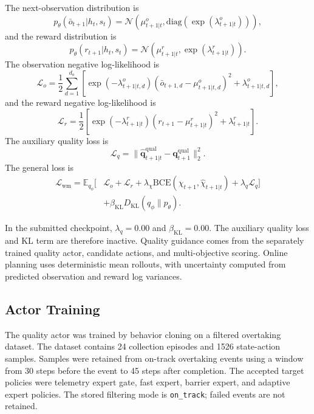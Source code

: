 \documentclass[journal]{IEEEtran}
\begin{document}
The next-observation distribution is
\begin{equation}
p_\theta(\bar{o}_{t+1}|h_t,s_t)
=
\mathcal{N}
(
\mu_{t+1|t}^{o},
\mathrm{diag}(\exp(\lambda_{t+1|t}^{o}))
),
\end{equation}
and the reward distribution is
\begin{equation}
p_\theta(r_{t+1}|h_t,s_t)
=
\mathcal{N}
(
\mu_{t+1|t}^{r},
\exp(\lambda_{t+1|t}^{r})
).
\end{equation}
The observation negative log-likelihood is
\begin{equation}
\mathcal{L}_{o}
=
\frac{1}{2}
\sum_{d=1}^{d_o}
[
\exp(-\lambda_{t+1|t,d}^{o})
(\bar{o}_{t+1,d}-\mu_{t+1|t,d}^{o})^2
+
\lambda_{t+1|t,d}^{o}
],
\end{equation}
and the reward negative log-likelihood is
\begin{equation}
\mathcal{L}_{r}
=
\frac{1}{2}
[
\exp(-\lambda_{t+1|t}^{r})
(r_{t+1}-\mu_{t+1|t}^{r})^2
+
\lambda_{t+1|t}^{r}
].
\end{equation}
The auxiliary quality loss is
\begin{equation}
\mathcal{L}_q
=
\|
\hat{\mathbf q}_{t+1|t}^{\mathrm{qual}}
-
\mathbf q_{t+1}^{\mathrm{qual}}
\|_2^2.
\end{equation}
The general loss is
\begin{equation}
\begin{aligned}
\mathcal{L}_{\mathrm{wm}}
=
\mathbb{E}_{q_\phi}
[
&
\mathcal{L}_o
+
\mathcal{L}_r
+
\lambda_\chi
\mathrm{BCE}
(
\chi_{t+1},
\hat{\chi}_{t+1|t}
)
+
\lambda_q\mathcal{L}_q
]
\\
&
+
\beta_{\mathrm{KL}}
D_{\mathrm{KL}}(q_\phi\|p_\theta).
\end{aligned}
\end{equation}

In the submitted checkpoint, $\lambda_q=0.00$ and
$\beta_{\mathrm{KL}}=0.00$. The auxiliary quality loss and KL term are
therefore inactive. Quality guidance comes from the separately trained
quality actor, candidate actions, and multi-objective scoring. Online
planning uses deterministic mean rollouts, with uncertainty computed
from predicted observation and reward log variances.

\subsection{Actor Training}
\label{supp:actor_training}

The quality actor was trained by behavior cloning on a filtered
overtaking dataset. The dataset contains 24 collection episodes and
1526 state-action samples. Samples were retained from on-track
overtaking events using a window from 30 steps before the event to 45
steps after completion. The accepted target policies were telemetry
expert gate, fast expert, barrier expert, and adaptive expert policies.
The stored filtering mode is \texttt{on\_track}; failed events are not
retained.
\end{document}
